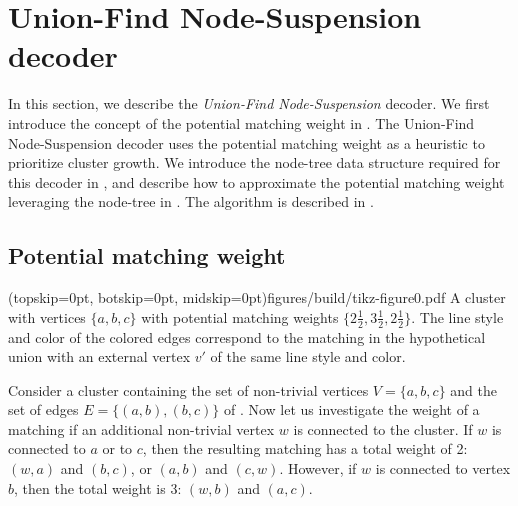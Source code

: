 \section{Union-Find Node-Suspension decoder}\label{sec:ufbb}
In this section, we describe the \emph{Union-Find Node-Suspension} decoder. We first introduce the concept of the potential matching weight in . The Union-Find Node-Suspension decoder uses the potential matching weight as a heuristic to prioritize cluster growth. We introduce the node-tree data structure required for this decoder in , and describe how to approximate the potential matching weight leveraging the node-tree in . The algorithm is described in . 

\subsection{Potential matching weight}\label{sec:matchingweight}

\Figure[htb](topskip=0pt, botskip=0pt, midskip=0pt){figures/build/tikz-figure0.pdf}{
    A cluster with vertices $\{a,b,c\}$ with potential matching weights $\{2\frac{1}{2}, 3\frac{1}{2}, 2\frac{1}{2}\}$. The line style and color of the colored edges correspond to the matching in the hypothetical union with an external vertex $v'$ of the same line style and color.\label{fig0}}


Consider a cluster containing the set of non-trivial vertices $V=\{a,b,c\}$ and the set of edges $E=\{(a,b), (b, c)\}$ of . Now let us investigate the weight of a matching if an additional non-trivial vertex $w$ is connected to the cluster. If $w$ is connected to $a$ or to $c$, then the resulting matching has a total weight of 2: $(w,a)$ and $(b,c)$, or $(a,b)$ and $(c,w)$. However, if $w$ is connected to vertex $b$, then the total weight is 3: $(w, b)$ and $(a, c)$. %

